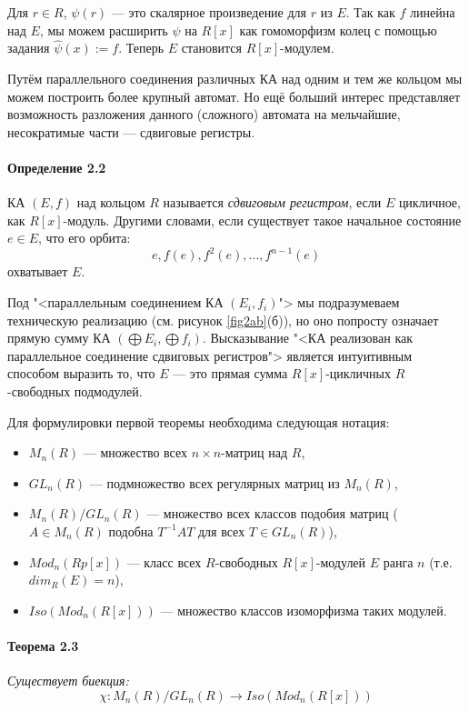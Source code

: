 \documentclass[a4paper,12pt]{article}
\begin{document}
Для $r \in R$, $\psi(r)$ --- это скалярное произведение для $r$ из $E$. Так как $f$ линейна над $E$, мы можем расширить $\psi$ на $R[x]$ как гомоморфизм колец с помощью задания $\hat{\psi}(x) := f$. Теперь $E$ становится $R[x]$-модулем.

Путём параллельного соединения различных КА над одним и тем же кольцом мы можем построить более крупный автомат. Но ещё больший интерес представляет возможность разложения данного (сложного) автомата на мельчайшие, несократимые части --- сдвиговые регистры.

\paragraph{Определение 2.2}
КА $(E,f)$ над кольцом $R$ называется \textit{сдвиговым регистром}, если $E$ цикличное, как $R[x]$-модуль. Другими словами, если существует такое начальное состояние $e \in E$, что его орбита:
$$
e, f(e), f^2(e), ..., f^{n-1}(e)
$$
охватывает $E$.

Под "<параллельным соединением КА $(E_i, f_i)$"> мы подразумеваем техническую реализацию (см. рисунок \ref{fig2ab}(б)), но оно попросту означает прямую сумму КА $(\bigoplus{E_i}, \bigoplus{f_i})$. Высказывание "<КА реализован как параллельное соединение сдвиговых регистров"> является интуитивным способом выразить то, что $E$ --- это прямая сумма $R[x]$-цикличных $R$-свободных подмодулей.

Для формулировки первой теоремы необходима следующая нотация:

\begin{itemize}
	\item $M_n(R)$ --- множество всех $n \times n$-матриц над $R$,
	\item $GL_n(R)$ --- подмножество всех регулярных матриц из $M_n(R)$,
	\item $M_n(R)/GL_n(R)$ --- множество всех классов подобия матриц ($A \in M_n(R)$ подобна $T^{-1}AT$ для всех $T \in GL_n(R)$),
	\item $Mod_n(Rp[x])$ --- класс всех $R$-свободных $R[x]$-модулей $E$ ранга $n$ (т.е. $dim_R(E) = n$),
	\item $Iso(Mod_n(R[x]))$ --- множество классов изоморфизма таких модулей.
\end{itemize}


\paragraph{Теорема 2.3}{\itshape
Существует биекция:
$$
\chi : M_n(R)/GL_n(R) \rightarrow Iso(Mod_n(R[x]))
$$
}
\end{document}
